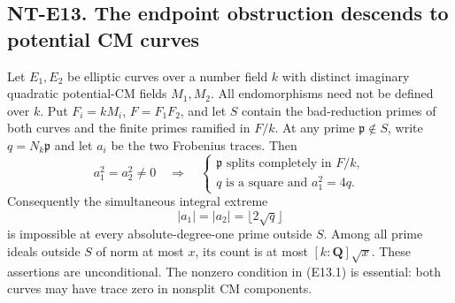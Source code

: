 \subsection*{NT-E13. The endpoint obstruction descends to potential CM curves}

Let \(E_1,E_2\) be elliptic curves over a number field \(k\)
with distinct imaginary quadratic potential-CM fields
\(M_1,M_2\). All endomorphisms need not be defined over \(k\).
Put \(F_i=kM_i\), \(F=F_1F_2\), and let \(S\) contain
the bad-reduction primes of both curves and the finite
primes ramified in \(F/k\). At any prime
\(\mathfrak p\notin S\), write \(q=N_k\mathfrak p\)
and let \(a_i\) be the two Frobenius traces.
Then
\[
       a_1^2=a_2^2\ne0
       \quad\Longrightarrow\quad
       \begin{cases}
       \mathfrak p\text{ splits completely in }F/k,\\
       q\text{ is a square and }a_1^2=4q .
       \end{cases}
                                                               \tag{E13.1}
\]
Consequently the simultaneous integral extreme
\[
              |a_1|=|a_2|=\lfloor2\sqrt q\rfloor
                                                               \tag{E13.2}
\]
is impossible at every absolute-degree-one prime outside
\(S\). Among all prime ideals outside \(S\) of norm at most
\(x\), its count is at most \([k:\mathbf Q]\sqrt x\).
These assertions are unconditional.
The nonzero condition in (E13.1) is essential: both curves
may have trace zero in nonsplit CM components.

